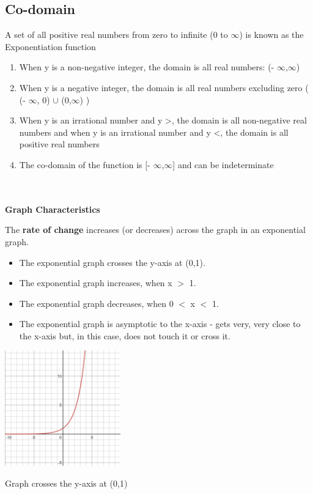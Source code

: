 \documentclass{article}
\begin{document}
\subsection*{Co-domain}
A set of all positive real numbers from zero to infinite (0 to \(\infty\)) is known as the Exponentiation function
\begin{enumerate}
\item When y is a non-negative integer, the domain is all real numbers:  (- $\infty$,$\infty$)

\item When y is a negative integer, the domain is all real numbers excluding zero ( (- $\infty$, 0) $\cup$ (0,$\infty$) )

\item When y is an irrational number and y \textgreater {}, the domain is all non-negative real numbers and when y is an irrational number and y \textless {}, the domain is all positive real numbers

\item The co-domain of the function is [- $\infty$,$\infty$] and can be indeterminate
\end{enumerate}
\begin{flushleft}
\\\\
\textbf{Graph Characteristics}
 \end{flushleft}
\begin{flushleft}
\cite{mathbits}\cite{wolframalpha} The \textbf{rate of change} increases (or decreases) across the graph in an exponential graph.
\end{flushleft}
\begin{itemize}
\item \label{graph} The exponential graph crosses the y-axis at (0,1). 
\item The exponential graph increases, when x \(>\) 1.
\item The exponential graph decreases, when 0 \(<\) x \(<\) 1.
\item The exponential graph is asymptotic to the x-axis - gets very, very close to the x-axis but, in this case, does not touch it or cross it.
\end{itemize}
\begin{center}
\includegraphics[width=5cm]{x^y}
\end{center}
\begin{center}
Graph crosses the y-axis at (0,1)\end{center}
\end{document}
